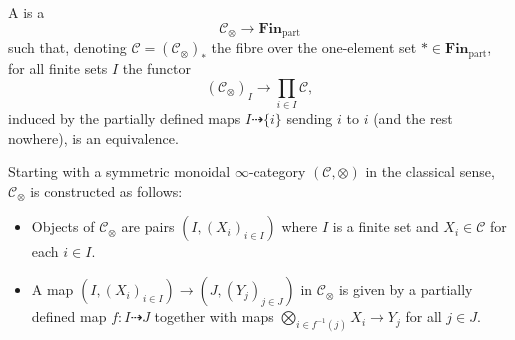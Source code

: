 \begin{definition} \label{definition:symmetric_monoidal_infinity_category_via_coCartesian_fibration}
A  is a 
\[ \mathcal{C}_\otimes \to \mathbf{Fin}_{\mathrm{part}} \]
such that, denoting $\mathcal{C} = (\mathcal{C}_\otimes)_*$ the fibre over the one-element set $\ast \in \mathbf{Fin}_{\mathrm{part}}$, for all finite sets $I$ the functor
\[ (\mathcal{C}_\otimes)_I \to \prod_{i \in I} \mathcal{C}, \]
induced by the partially defined maps $I \dashrightarrow \{i\}$ sending $i$ to $i$ (and the rest nowhere), is an equivalence.

Starting with a symmetric monoidal $\infty$-category $(\mathcal{C}, \otimes)$ in the classical sense, $\mathcal{C}_\otimes$ is constructed as follows:
\begin{itemize}
    \item Objects of $\mathcal{C}_\otimes$ are pairs $(I, (X_i)_{i \in I})$ where $I$ is a finite set and $X_i \in \mathcal{C}$ for each $i \in I$.
    \item A map $(I, (X_i)_{i \in I}) \to (J, (Y_j)_{j \in J})$ in $\mathcal{C}_\otimes$ is given by a partially defined map $f : I \dashrightarrow J$ together with maps $\bigotimes_{i \in f^{-1}(j)} X_i \to Y_j$ for all $j \in J$.
\end{itemize}
\end{definition}
